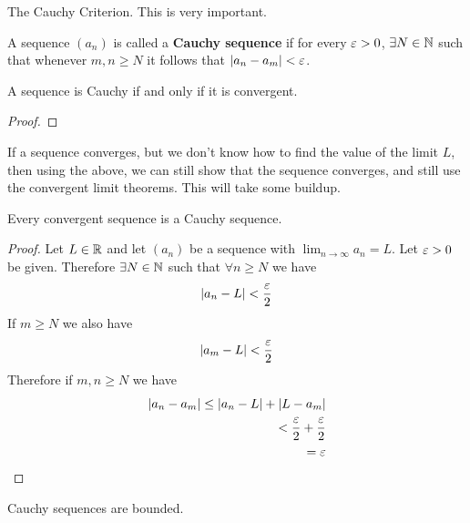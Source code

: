 
The Cauchy Criterion. This is very important.

\begin{definition}
	A sequence $\left( a_n \right) $ is called a \textbf{Cauchy sequence} if for every $\e > 0$, $\exists N \in  \mathbb{N}$ such that whenever $m, n \ge N$ it follows that $\left|a_n - a_m\right| < \e$.
\end{definition}

\begin{theorem}
	A sequence is Cauchy if and only if it is convergent.
\end{theorem}

\begin{proof}	
	
\end{proof}

\begin{note}
	If a sequence converges, but we don't know how to find the value of the limit  $L$, then using the above, we can still show that the sequence converges, and still use the convergent limit theorems. This will take some buildup.
\end{note}

\begin{theorem}
	Every convergent sequence is a Cauchy sequence.
\end{theorem}

\begin{proof}
	Let $L \in  \mathbb{R}$ and let $\left( a_n \right) $ be a sequence with $\lim_{n \to \infty } a_n = L$. Let $\e > 0$ be given. Therefore $\exists N \in \mathbb{N}$ such that $\forall n\ge N$ we have 
	\begin{align}
		\left|a_n - L\right| < \frac{\e}{2}
	\end{align}
	If $m \ge N$ we also have
	\begin{align}
		\left|a_m - L \right| < \frac{\e}{2}
	\end{align}
	Therefore if $m,n \ge N$ we have
	\begin{align}
		\left|a_n -a_m\right| \le \left|a_n - L\right| + \left|L - a_m\right| \\
		< \frac{\e}{2} + \frac{\e}{2} \\
		= \e
	\end{align}
\end{proof}

\begin{theorem}
	Cauchy sequences are bounded.
\end{theorem}

